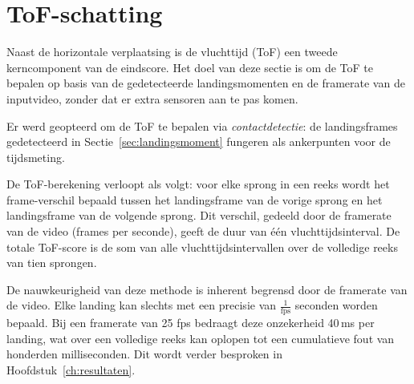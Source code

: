\section{ToF-schatting}
\label{sec:tof}

Naast de horizontale verplaatsing is de vluchttijd (ToF) een tweede kerncomponent van de eindscore. Het doel van deze sectie is om de ToF te bepalen op basis van de gedetecteerde landingsmomenten en de framerate van de inputvideo, zonder dat er extra sensoren aan te pas komen.

Er werd geopteerd om de ToF te bepalen via \textit{contactdetectie}: de landingsframes gedetecteerd in Sectie~\ref{sec:landingsmoment} fungeren als ankerpunten voor de tijdsmeting.

De ToF-berekening verloopt als volgt: voor elke sprong in een reeks wordt het frame-verschil bepaald tussen het landingsframe van de vorige sprong en het landingsframe van de volgende sprong. Dit verschil, gedeeld door de framerate van de video (frames per seconde), geeft de duur van één vluchttijdsinterval. De totale ToF-score is de som van alle vluchttijdsintervallen over de volledige reeks van tien sprongen.

De nauwkeurigheid van deze methode is inherent begrensd door de framerate van de video. Elke landing kan slechts met een precisie van $\tfrac{1}{\text{fps}}$ seconden worden bepaald. Bij een framerate van 25 fps bedraagt deze onzekerheid 40\,ms per landing, wat over een volledige reeks kan oplopen tot een cumulatieve fout van honderden milliseconden. Dit wordt verder besproken in Hoofdstuk~\ref{ch:resultaten}.
